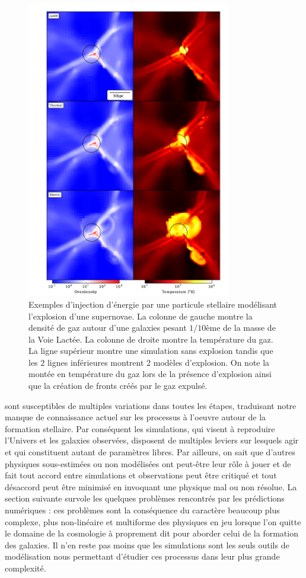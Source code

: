 \begin{figure}[htbp]
	\centering
		\includegraphics[height=13cm]{figs/SN.png}
	\caption[Exemples d'injection d'énergie par une particule stellaire modélisant l'explosion d'une supernovae. ]{Exemples d'injection d'énergie par une particule stellaire modélisant l'explosion d'une supernovae. La colonne de gauche montre la densité de gaz autour d'une galaxies pesant $1/10$ème de la masse de la Voie Lactée. La colonne de droite montre la température du gaz. La ligne supérieur montre une simulation sans explosion tandis que les 2 lignes inférieures montrent 2 modèles d'explosion. On note la montée en température du gaz lors de la présence d'explosion ainsi que la création de fronts créés par le gaz expulsé.}
	\label{f:SN}
\end{figure}


 sont susceptibles de multiples variations dans toutes les étapes, traduisant notre manque de connaissance actuel sur les processus à l'oeuvre autour de la formation stellaire. Par conséquent les simulations, qui visent à reproduire l'Univers et les galaxies observées, disposent de multiples leviers sur lesquels agir et qui constituent autant de paramètres libres. Par ailleurs, on sait que d'autres physiques sous-estimées ou non modélisées ont peut-être leur rôle à jouer et de fait tout accord entre simulations et observations peut être critiqué et tout désaccord peut être minimisé en invoquant une physique mal ou non résolue. La section suivante survole les quelques problèmes rencontrés par les prédictions numériques : ces problèmes sont la conséquence du caractère beaucoup plus complexe, plus non-linéaire et multiforme des physiques en jeu lorsque l'on quitte le domaine de la cosmologie à proprement dit pour aborder celui de la formation des galaxies. Il n'en reste pas moins que les simulations sont les seuls outils de modélisation nous permettant d'étudier ces processus dans leur plus grande complexité.
